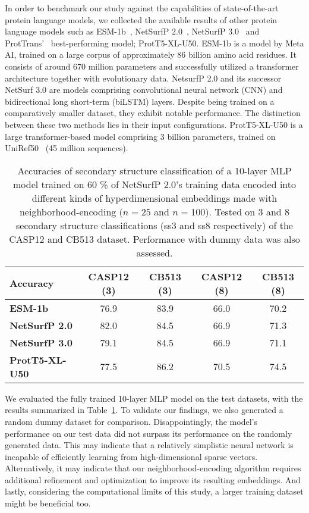 In order to benchmark our study against the capabilities of state-of-the-art protein language models, we collected the available results of other protein language models such as ESM-1b~\cite{esm}, NetSurfP 2.0~\cite{netsurf}, NetSurfP 3.0~\cite{netsurf3} and ProtTrans'~\cite{prottrans} best-performing model; ProtT5-XL-U50. ESM-1b is a model by Meta AI, trained on a large corpus of approximately 86 billion amino acid residues. It consists of around 670 million parameters and successfully utilized a transformer architecture together with evolutionary data. NetsurfP 2.0 and its successor NetSurf 3.0 are models comprising convolutional neural network (CNN) and bidirectional long short-term (biLSTM) layers. Despite being trained on a comparatively smaller dataset, they exhibit notable performance. The distinction between these two methods lies in their input configurations. ProtT5-XL-U50 is a large transformer-based model comprising 3 billion parameters, trained on UniRef50~\cite{uniref} (45 million sequences).

\begin{table}[h]
    \caption{Accuracies of secondary structure classification of a 10-layer MLP model trained on 60 \% of NetSurfP 2.0's training data encoded into different kinds of hyperdimensional embeddings made with neighborhood-encoding ($n = 25$ and $n=100$). Tested on 3 and 8 secondary structure classifications (ss3 and ss8 respectively) of the CASP12 and CB513 dataset. Performance with dummy data was also assessed.}
    \label{tab:casp}
    \centering
    \begin{tabular}{lcc|cc}
        \toprule
        \textbf{Accuracy} & CASP12 (3) & CB513 (3) & CASP12 (8) & CB513 (8)\\
        \midrule
        \textbf{ESM-1b} & 76.9 & 83.9 & 66.0 & 70.2\\
        \textbf{NetSurfP 2.0} & 82.0 & 84.5 & 66.9 & 71.3\\
        \textbf{NetSurfP 3.0} & 79.1 & 84.5 & 66.9 & 71.1\\
        \textbf{ProtT5-XL-U50} & 77.5 & 86.2 & 70.5 & 74.5\\
        \bottomrule
    \end{tabular}
  \end{table}

We evaluated the fully trained 10-layer MLP model on the test datasets, with the results summarized in Table~\ref{tab:casp}. To validate our findings, we also generated a random dummy dataset for comparison. Disappointingly, the model's performance on our test data did not surpass its performance on the randomly generated data. This may indicate that a relatively simplistic neural network is incapable of efficiently learning from high-dimensional sparse vectors. Alternatively, it may indicate that our neighborhood-encoding algorithm requires additional refinement and optimization to improve its resulting embeddings. And lastly, considering the computational limits of this study, a larger training dataset might be beneficial too.

